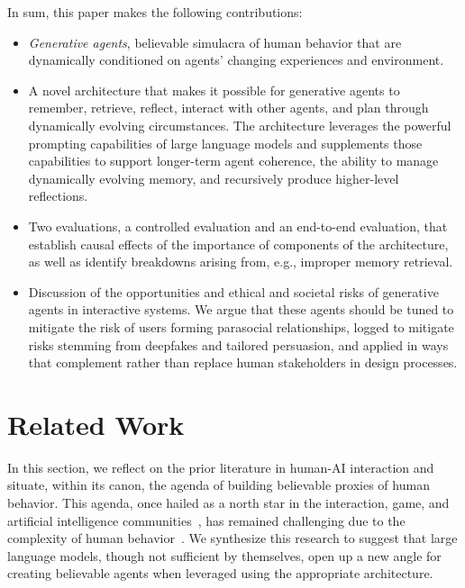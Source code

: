 In sum, this paper makes the following contributions:

\begin{itemize}
    \item \textit{Generative agents}, believable simulacra of human behavior that are dynamically conditioned on agents' changing experiences and environment.
    \item A novel architecture that makes it possible for generative agents to remember, retrieve, reflect, interact with other agents, and plan through dynamically evolving circumstances. The architecture leverages the powerful prompting capabilities of large language models and supplements those capabilities to support longer-term agent coherence, the ability to manage dynamically evolving memory, and recursively produce higher-level reflections.
    \item Two evaluations, a controlled evaluation and an end-to-end evaluation, that establish causal effects of the importance of components of the architecture, as well as identify breakdowns arising from, e.g., improper memory retrieval. 
    \item Discussion of the opportunities and ethical and societal risks of generative agents in interactive systems. We argue that these agents should be tuned to mitigate the risk of users forming parasocial relationships, logged to mitigate risks stemming from deepfakes and tailored persuasion, and applied in ways that complement rather than replace human stakeholders in design processes.
\end{itemize}

\section{Related Work} In this section, we reflect on the prior literature in human-AI interaction and situate, within its canon, the agenda of building believable proxies of human behavior. This agenda, once hailed as a north star in the interaction, game, and artificial intelligence communities~\cite{4_laird2001human, 6_riedl2012interactive, 21_riedl2005objective, 22_bates1994role}, has remained challenging due to the complexity of human behavior~\cite{23_brooks2000cog, 25_yannakakis2012game}. We synthesize this research to suggest that large language models, though not sufficient by themselves, open up a new angle for creating believable agents when leveraged using the appropriate architecture.

